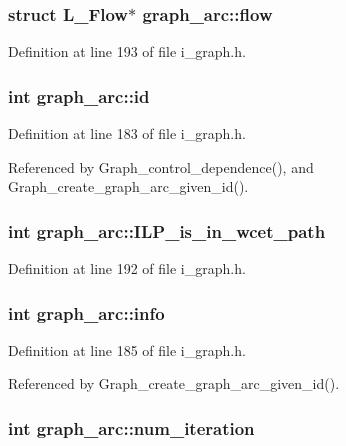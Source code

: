 \subsubsection{\setlength{\rightskip}{0pt plus 5cm}struct L\_\-Flow$\ast$ \bf{graph\_\-arc::flow}}\label{structgraph__arc_1e38e435e3122b25f264e6b63f63436a}




Definition at line 193 of file i\_\-graph.h.
\subsubsection{\setlength{\rightskip}{0pt plus 5cm}int \bf{graph\_\-arc::id}}\label{structgraph__arc_e672f21c8235d2c4d07e75221deeb7af}




Definition at line 183 of file i\_\-graph.h.

Referenced by Graph\_\-control\_\-dependence(), and Graph\_\-create\_\-graph\_\-arc\_\-given\_\-id().
\subsubsection{\setlength{\rightskip}{0pt plus 5cm}int \bf{graph\_\-arc::ILP\_\-is\_\-in\_\-wcet\_\-path}}\label{structgraph__arc_f95c06486397d180cc48a77fa3a536e0}




Definition at line 192 of file i\_\-graph.h.
\subsubsection{\setlength{\rightskip}{0pt plus 5cm}int \bf{graph\_\-arc::info}}\label{structgraph__arc_6148f08060ab3e74c15be45f6683b711}




Definition at line 185 of file i\_\-graph.h.

Referenced by Graph\_\-create\_\-graph\_\-arc\_\-given\_\-id().
\subsubsection{\setlength{\rightskip}{0pt plus 5cm}int \bf{graph\_\-arc::num\_\-iteration}}\label{structgraph__arc_78f80eac077d9324fee0c36d38641cd5}





